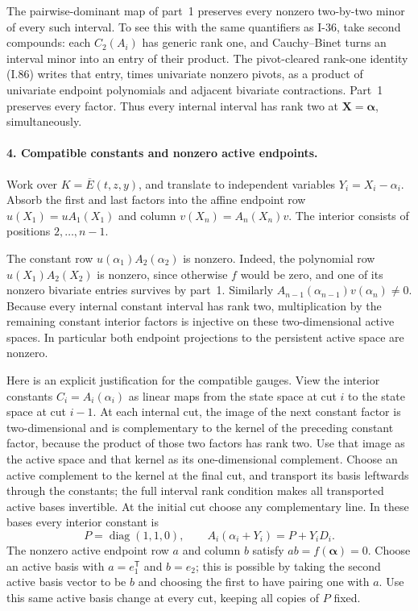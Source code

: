 The pairwise-dominant map of part~1 preserves every nonzero
two-by-two minor of every such interval. To see this with the
same quantifiers as I-36, take second compounds: each
$C_2(A_i)$ has generic rank one, and Cauchy--Binet turns an
interval minor into an entry of their product. The pivot-cleared
rank-one identity (I.86) writes that entry, times univariate
nonzero pivots, as a product of univariate endpoint polynomials
and adjacent bivariate contractions. Part~1 preserves every
factor. Thus every internal interval has rank two at
$\mathbf X=\boldsymbol\alpha$, simultaneously.

\paragraph{4. Compatible constants and nonzero active endpoints.}
Work over $K=\overline E(t,z,y)$, and translate to independent
variables $Y_i=X_i-\alpha_i$. Absorb the first and last factors
into the affine endpoint row $u(X_1)=uA_1(X_1)$ and column
$v(X_n)=A_n(X_n)v$. The interior consists of positions
$2,\ldots,n-1$.

The constant row $u(\alpha_1)A_2(\alpha_2)$ is nonzero. Indeed,
the polynomial row $u(X_1)A_2(X_2)$ is nonzero, since otherwise
$f$ would be zero, and one of its nonzero bivariate entries
survives by part~1. Similarly
$A_{n-1}(\alpha_{n-1})v(\alpha_n)\ne0$. Because every internal
constant interval has rank two, multiplication by the remaining
constant interior factors is injective on these two-dimensional
active spaces. In particular both endpoint projections to the
persistent active space are nonzero.

Here is an explicit justification for the compatible gauges.
View the interior constants $C_i=A_i(\alpha_i)$ as linear maps
from the state space at cut $i$ to the state space at cut $i-1$.
At each internal cut, the image of the next constant factor is
two-dimensional and is complementary to the kernel of the
preceding constant factor, because the product of those two
factors has rank two. Use that image as the active space and
that kernel as its one-dimensional complement. Choose an
active complement to the kernel at the final cut, and transport
its basis leftwards through the constants; the full interval
rank condition makes all transported active bases invertible.
At the initial cut choose any complementary line. In these
bases every interior constant is
\[
 P=\operatorname{diag}(1,1,0),\qquad
 A_i(\alpha_i+Y_i)=P+Y_iD_i.
 \tag{I.95}
\]
The nonzero active endpoint row $a$ and column $b$ satisfy
$ab=f(\boldsymbol\alpha)=0$. Choose an active basis with
$a=e_1^{\mathsf T}$ and $b=e_2$; this is possible by taking
the second active basis vector to be $b$ and choosing the first
to have pairing one with $a$. Use this same active basis change
at every cut, keeping all copies of $P$ fixed.

